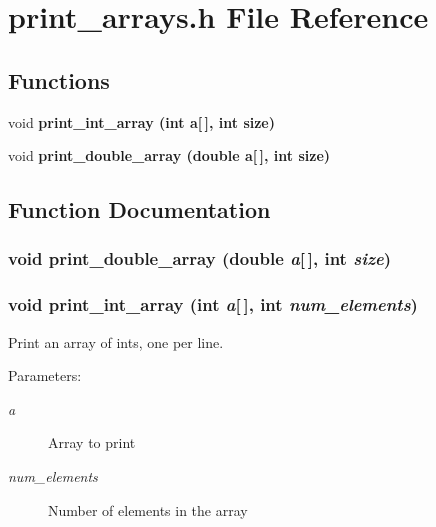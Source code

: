 \section{print\_\-arrays.h File Reference}
\label{print__arrays_8h}
\subsection*{Functions}
\begin{CompactItemize}
\item 
void \bf{print\_\-int\_\-array} (int a[$\,$], int size)
\item 
void \bf{print\_\-double\_\-array} (double a[$\,$], int size)
\end{CompactItemize}


\subsection{Function Documentation}
\subsubsection{\setlength{\rightskip}{0pt plus 5cm}void print\_\-double\_\-array (double {\em a}[$\,$], int {\em size})}\label{print__arrays_8h_2c63d62a01ac25bf7c4fa67be16bf004}


\subsubsection{\setlength{\rightskip}{0pt plus 5cm}void print\_\-int\_\-array (int {\em a}[$\,$], int {\em num\_\-elements})}\label{print__arrays_8h_095c9149423818a7dbfe4003e5940f97}


Print an array of ints, one per line. \begin{Desc}
\item[Parameters:]
\begin{description}
\item[{\em a}]Array to print \item[{\em num\_\-elements}]Number of elements in the array \end{description}
\end{Desc}
